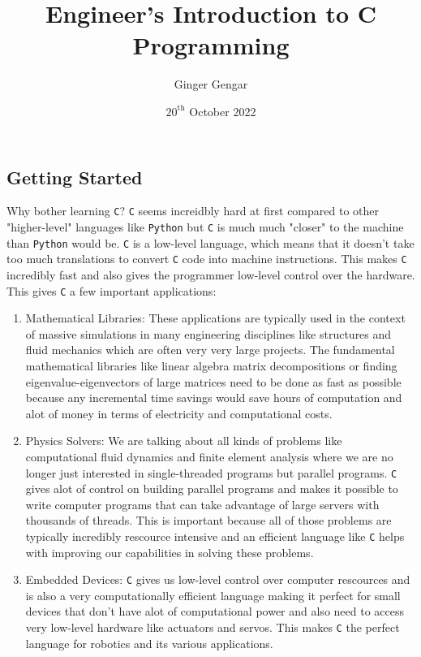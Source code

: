 \documentclass[a4paper, 12pt]{report}
\title{Engineer's Introduction to C Programming}
\author{Ginger Gengar}
\date{$20^{\text{th}}$ October 2022}
\begin{document}
\maketitle
\tableofcontents
\newpage
\begin{center}

\section{Getting Started}
\begin{comment}
\end{comment}
Why bother learning \texttt{C}? \texttt{C} seems increidbly hard at first compared to other "higher-level" languages like \texttt{Python} but \texttt{C} is much much "closer" to the machine than \texttt{Python} would be.
\texttt{C} is a low-level language, which means that it doesn't take too much translations to convert \texttt{C} code into machine instructions.
This makes \texttt{C} incredibly fast and also gives the programmer low-level control over the hardware.
This gives \texttt{C} a few important applications:
\begin{enumerate}
\item Mathematical Libraries: These applications are typically used in the context of massive simulations in many engineering disciplines like structures and fluid mechanics which are often very very large projects.
The fundamental mathematical libraries like linear algebra matrix decompositions or finding eigenvalue-eigenvectors of large matrices need to be done as fast as possible because any incremental time savings would save hours of computation and alot of money in terms of electricity and computational costs.
\item Physics Solvers: We are talking about all kinds of problems like computational fluid dynamics and finite element analysis where we are no longer just interested in single-threaded programs but parallel programs.
\texttt{C} gives alot of control on building parallel programs and makes it possible to write computer programs that can take advantage of large servers with thousands of threads.
This is important because all of those problems are typically incredibly rescource intensive and an efficient language like \texttt{C} helps with improving our capabilities in solving these problems.
\item Embedded Devices: \texttt{C} gives us low-level control over computer rescources and is also a very computationally efficient language making it perfect for small devices that don't have alot of computational power and also need to access very low-level hardware like actuators and servos.
This makes \texttt{C} the perfect language for robotics and its various applications.


\end{enumerate}
\end{center}
\end{document}
